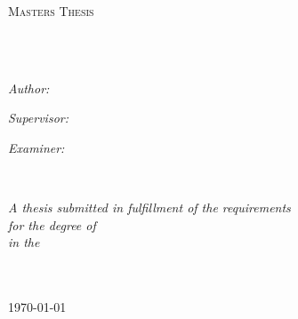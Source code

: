 \documentclass[
11pt, %
english, %
singlespacing, %
headsepline, %
]{MastersDoctoralThesis} %
\author{Felix \textsc{Friese}} %
\begin{document}
\frontmatter %

\pagestyle{plain} %


\begin{titlepage}
\begin{center}

\vspace*{.06\textheight}
{\scshape\LARGE \univname\par}\vspace{1.5cm} %
\textsc{\Large Masters Thesis}\\[0.5cm] %

\HRule \\[0.4cm] %
{\huge \bfseries \ttitle\par}\vspace{0.4cm} %
\HRule \\[1.5cm] %
 
\begin{minipage}[t]{0.4\textwidth}
\begin{flushleft} \large
\emph{Author:}\\
\href{}{\authorname} %
\end{flushleft}
\end{minipage}
\begin{minipage}[t]{0.4\textwidth}
\begin{flushright} \large
\emph{Supervisor:} \\
\href{https://ni.www.techfak.uni-bielefeld.de/people/afinke}{\supname} %

\vspace*{.04\textheight}

\emph{Examiner:} \\
\href{https://ni.www.techfak.uni-bielefeld.de/people/mschilli}{\examname} %
\end{flushright}
\end{minipage}\\[3cm]
 
\vfill

\large \textit{A thesis submitted in fulfillment of the requirements\\ for the degree of \degreename}\\[0.3cm] %
\textit{in the}\\[0.4cm]
\groupname\\\deptname\\[2cm] %
 
\vfill

{\large \today}\\[4cm] %
 
\vfill
\end{center}
\end{titlepage}
\end{document}
